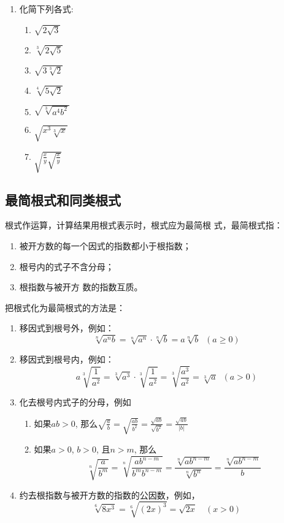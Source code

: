 \begin{ex}
\begin{enumerate}
\item 化简下列各式:
\begin{multicols}{2}
    \begin{enumerate}
    \item $\sqrt{2 \sqrt{3}}$
    \item $\sqrt[3]{2 \sqrt{5}}$
    \item $\sqrt{3\sqrt[3]{2}}$
    \item $\sqrt[4]{5 \sqrt{2}}$
    \item $\sqrt{\sqrt[3]{a^{4} b^{2}}}$
    \item $\sqrt{x^{3} \sqrt[3]{x}}$
    \item $\sqrt{\frac{x}{y} \sqrt{\frac{x}{y}}}$
    \end{enumerate}
\end{multicols}
\end{enumerate}
     
\end{ex}


\subsection{最简根式和同类根式}
根式作运算，计算结果用根式表示时，根式应为最简根
式，最简根式指：
\begin{enumerate}
    \item 被开方数的每一个因式的指数都小于根指数；
    \item 根号内的式子不含分母；
    \item 根指数与被开方
数的指数互质。
\end{enumerate}

把根式化为最简根式的方法是：
\begin{enumerate}
    \item 移因式到根号外，例如：\[\sqrt[n]{a^nb}=\sqrt[n]{a^n}\cdot \sqrt[n]{b}=a\sqrt[n]{b}\;\;(a\ge 0)\]
    \item 移因式到根号内，例如：\[a\sqrt[3]{\frac{1}{a^2}}=\sqrt[3]{a^3}\cdot \sqrt[3]{\frac{1}{a^2}}=\sqrt[3]{\frac{a^3}{a^2}}=\sqrt[3]{a}\;\;(a>0)\]
    \item 化去根号内式子的分母，例如
    \begin{enumerate}
        \item 如果$ab>0$, 那么$\sqrt{\frac{a}{b}}=\sqrt{\frac{ab}{b^2}}=\frac{\sqrt{ab}}{\sqrt{b^2}}=\frac{\sqrt{ab}}{|b|}$
        \item 如果$a>0$, $b>0$, 且$n>m$, 那么
        \[\sqrt[n]{\frac{a}{b^m}}=\sqrt[n]{\frac{ab^{n-m}}{b^mb^{n-m}}}=\frac{\sqrt[n]{ab^{n-m}}}{\sqrt[n]{b^n}}=\frac{\sqrt[n]{ab^{n-m}}}{b} \]
    \end{enumerate}
\item 约去根指数与被开方数的指数的公因数，例如，
\[\sqrt[6]{8x^3}=\sqrt[6]{(2x)^3}=\sqrt{2x}\quad (x>0)\]
\end{enumerate}

